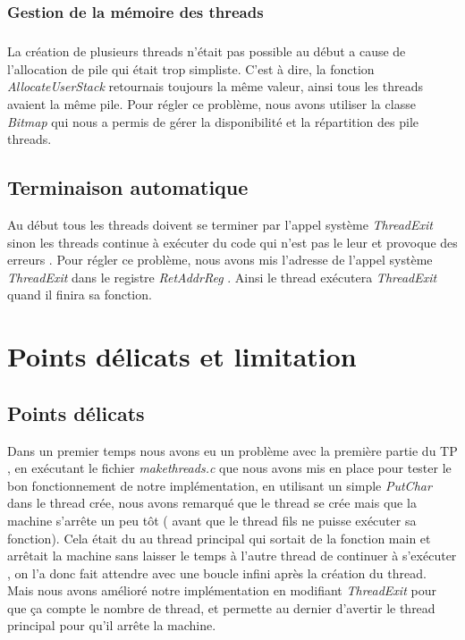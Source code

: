 \documentclass[12pt, a4paper]{report}
\begin{document}
\subsection{Gestion de la mémoire des threads }
   \paragraph{}
   La création de plusieurs threads n'était pas possible au début a cause de l'allocation de pile qui était trop simpliste. C'est à dire, la fonction \textit{ AllocateUserStack } retournais toujours la même valeur, ainsi tous les threads avaient la même pile. Pour régler ce problème, nous avons utiliser la classe \textit{ Bitmap } qui nous a permis de gérer la disponibilité et la répartition des pile threads.

\section{Terminaison automatique}
Au début tous les threads doivent se terminer par l'appel système  \textit{ ThreadExit } sinon les threads continue à exécuter du code qui n'est pas le leur et provoque des erreurs . Pour régler ce problème, nous avons mis l'adresse de l'appel système \textit{ ThreadExit } dans le registre \textit{ RetAddrReg }. Ainsi le thread exécutera \textit{ ThreadExit }  quand il finira sa fonction.   

\chapter{Points délicats et limitation }
	\section{Points délicats}
	Dans un premier temps nous avons eu un problème avec la première partie du TP , en exécutant le fichier  \textit{ makethreads.c } que nous avons mis en place pour tester le bon fonctionnement de notre implémentation, en utilisant un simple  \textit{ PutChar } dans le thread crée, nous avons remarqué que le thread se crée mais que la machine s'arrête un peu tôt ( avant que le thread fils ne puisse exécuter sa fonction). Cela était du au thread principal qui sortait de la fonction main et arrêtait la machine sans laisser le temps à l'autre thread de continuer à s'exécuter , on l'a donc fait attendre avec une boucle infini après la création du thread.\\
	Mais nous avons amélioré notre implémentation en modifiant \textit{ ThreadExit } pour que ça compte le nombre de thread, et permette au dernier d'avertir le thread principal pour qu'il arrête la machine.
	
\end{document}
